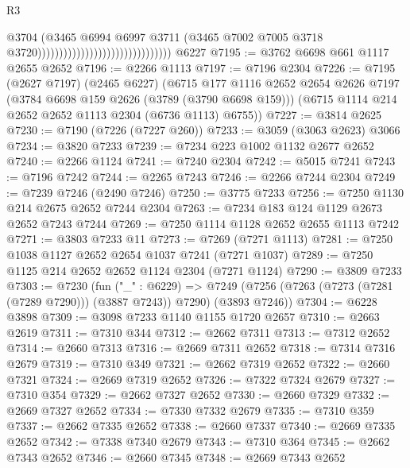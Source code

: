 \begin{lexlean}{R3}
\begin{coremodule}
                                                              @3704
                                                              (@3465
                                                                @6994
                                                                @6997
                                                                @3711
                                                                (@3465
                                                                  @7002
                                                                  @7005
                                                                  @3718
                                                                  @3720)))))))))))))))))))))))))))))))
    @6227
@7195 := @3762 @6698 @661 @1117 @2655 @2652
@7196 := @2266 @1113
@7197 := @7196 @2304
@7226 := @7195
    (@2627 @7197)
    (@2465 @6227)
    (@6715
      @177
      @1116
      @2652
      @2654
      @2626
      @7197
      (@3784 @6698 @159 @2626 (@3789 (@3790 @6698 @159)))
      (@6715 @1114 @214 @2652 @2652 @1113 @2304 (@6736 @1113) @6755))
@7227 := @3814 @2625
@7230 := @7190 (@7226 (@7227 @260))
@7233 := @3059 (@3063 @2623) @3066
@7234 := @3820 @7233
@7239 := @7234 @223 @1002 @1132 @2677 @2652
@7240 := @2266 @1124
@7241 := @7240 @2304
@7242 := @5015 @7241
@7243 := @7196 @7242
@7244 := @2265 @7243
@7246 := @2266 @7244 @2304
@7249 := @7239 @7246 (@2490 @7246)
@7250 := @3775 @7233
@7256 := @7250 @1130 @214 @2675 @2652 @7244 @2304
@7263 := @7234 @183 @124 @1129 @2673 @2652 @7243 @7244
@7269 := @7250 @1114 @1128 @2652 @2655 @1113 @7242
@7271 := @3803 @7233 @11
@7273 := @7269 (@7271 @1113)
@7281 := @7250 @1038 @1127 @2652 @2654 @1037 @7241 (@7271 @1037)
@7289 := @7250 @1125 @214 @2652 @2652 @1124 @2304 (@7271 @1124)
@7290 := @3809 @7233
@7303 := @7230
    (fun ("_" : @6229) =>
    @7249 (@7256 (@7263 (@7273 (@7281 (@7289 @7290))) (@3887 @7243)) @7290) (@3893 @7246))
@7304 := @6228 @3898
@7309 := @3098 @7233 @1140 @1155 @1720 @2657
@7310 := @2663 @2619
@7311 := @7310 @344
@7312 := @2662 @7311
@7313 := @7312 @2652
@7314 := @2660 @7313
@7316 := @2669 @7311 @2652
@7318 := @7314 @7316 @2679
@7319 := @7310 @349
@7321 := @2662 @7319 @2652
@7322 := @2660 @7321
@7324 := @2669 @7319 @2652
@7326 := @7322 @7324 @2679
@7327 := @7310 @354
@7329 := @2662 @7327 @2652
@7330 := @2660 @7329
@7332 := @2669 @7327 @2652
@7334 := @7330 @7332 @2679
@7335 := @7310 @359
@7337 := @2662 @7335 @2652
@7338 := @2660 @7337
@7340 := @2669 @7335 @2652
@7342 := @7338 @7340 @2679
@7343 := @7310 @364
@7345 := @2662 @7343 @2652
@7346 := @2660 @7345
@7348 := @2669 @7343 @2652

\end{coremodule}
\end{lexlean}
